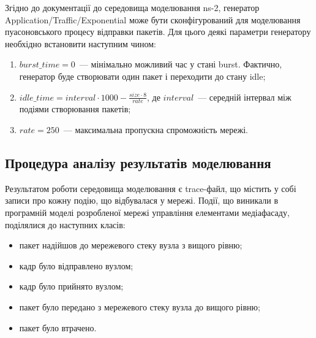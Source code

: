 \documentclass[a4paper,ukrainian,utf8,nocolumnsxix,floatsection,equationsection]{eskdtext}
\begin{document}
Згідно до документації до середовища моделювання ns-2, генератор Application/Traffic/Exponential може бути сконфігурований для моделювання пуасоновського процесу відправки пакетів. Для цього деякі параметри генератору необхідно встановити наступним чином:
\begin{enumerate}
	\item $burst\_time = 0$~--- мінімально можливий час у стані burst. Фактично, генератор буде створювати один пакет і переходити до стану idle;
	\item $idle\_time = interval\cdot1000 - \frac{size \cdot 8}{rate}$, де $interval$~--- середній інтервал між подіями створювання пакетів;
	\item $rate = 250$~--- максимальна пропускна спроможність мережі.
\end{enumerate}

\subsection{Процедура аналізу результатів моделювання}

Результатом роботи середовища моделювання є trace-файл, що містить у собі записи про кожну подію, що відбувалася у мережі. Події, що виникали в програмній моделі розробленої мережі управління елементами медіафасаду, поділялися до наступних класів:
\begin{itemize}
	\item пакет надійшов до мережевого стеку вузла з вищого рівню;
	\item кадр було відправлено вузлом;
	\item кадр було прийнято вузлом;
	\item пакет було передано з мережевого стеку вузла до вищого рівню;
	\item пакет було втрачено.
\end{itemize}
\end{document}
